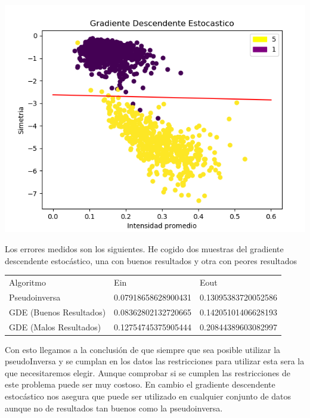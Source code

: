\documentclass[titlepage]{article}
\begin{document}
	\begin{center}
		\includegraphics[scale=0.5]{gde.png}
	\end{center}
	
	Los errores medidos son los siguientes. He cogido dos muestras del gradiente descendente estocástico, una con buenos resultados y otra con peores resultados
	
	\begin{center}
		\begin{tabular}{lll}
			Algoritmo & Ein & Eout \\
			Pseudoinversa   & 0.07918658628900431  & 0.13095383720052586   \\
			GDE (Buenos Resultados)      & 0.08362802132720665  &  0.14205101406628193 \\
			GDE (Malos Resultados)      & 0.12754745375905444  &  0.20844389603082997
		\end{tabular}	
	\end{center}

	Con esto llegamos a la conclusión de que siempre que sea posible utilizar la pseudoInversa y se cumplan en los datos las restricciones para utilizar esta sera la que necesitaremos elegir. Aunque comprobar si se cumplen las restricciones de este problema puede ser muy costoso.
	En cambio el gradiente descendente estocástico nos asegura que puede ser utilizado en cualquier conjunto de datos aunque no de resultados tan buenos como la pseudoinversa.
	
\newpage
  
  
  
\end{document}

